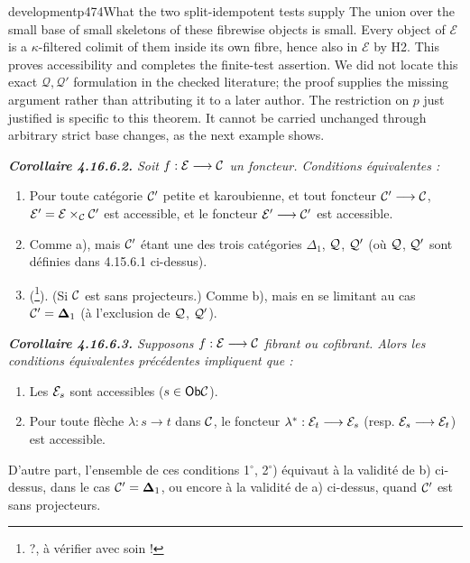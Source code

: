 \begin{dcomment}{development}{p474}{What the two split-idempotent tests supply}
The union over the small base of small skeletons of these fibrewise objects is small. Every object of $\mathcal E$ is a $\kappa$-filtered colimit of them inside its own fibre, hence also in $\mathcal E$ by H2. This proves accessibility and completes the finite-test assertion. We did not locate this exact $\mathcal Q,\mathcal Q'$ formulation in the checked literature; the proof supplies the missing argument rather than attributing it to a later author. The restriction on $p$ just justified is specific to this theorem. It cannot be carried unchanged through arbitrary strict base changes, as the next example shows.
\end{dcomment}


\begingroup\itshape
\noindent\textbf{\upshape Corollaire 4.16.6.2.} Soit $f : \mathcal{E} \longrightarrow \mathcal{C}$ un foncteur. Conditions équivalentes :
\begin{enumerate}[label={}]
\item[a)] Pour toute catégorie $\mathcal{C}'$ \textup{petite} et \textup{karoubienne}, et tout foncteur $\mathcal{C}' \longrightarrow \mathcal{C}$, $\mathcal{E}' = \mathcal{E} \times_{\mathcal{C}} \mathcal{C}'$ est accessible, et le foncteur $\mathcal{E}' \longrightarrow \mathcal{C}'$ est accessible.
\item[b)] Comme a), mais $\mathcal{C}'$ étant une des trois catégories $\Delta_1$, $\mathcal{Q}$, $\mathcal{Q}'$ (où $\mathcal{Q}$, $\mathcal{Q}'$ sont définies dans 4.15.6.1 ci-dessus).
\item[b$'$)] \textup{(}\footnote{?, à vérifier avec soin !}\textup{)}. (Si $\mathcal{C}$ est sans projecteurs.) Comme b), mais en se limitant au cas $\mathcal{C}' = \boldsymbol{\Delta}_1$ (à l'exclusion de $\mathcal{Q}$, $\mathcal{Q}'$).
\end{enumerate}
\endgroup

\begingroup\itshape
\noindent\textbf{\upshape Corollaire 4.16.6.3.} Supposons $f : \mathcal{E} \longrightarrow \mathcal{C}$ fibrant ou cofibrant. Alors les conditions équivalentes précédentes impliquent que :
\begin{enumerate}[label={}]
\item[1$^\circ$)] Les $\mathcal{E}_s$ sont accessibles ($s \in \mathsf{Ob} \mathcal{C}$).
\item[2$^\circ$)] Pour toute flèche $\lambda : s \longrightarrow t$ dans $\mathcal{C}$, le foncteur $\lambda^* : \mathcal{E}_t \longrightarrow \mathcal{E}_s$ (resp. $\mathcal{E}_s \longrightarrow \mathcal{E}_t$) est accessible.
\end{enumerate}
\noindent D'autre part, l'ensemble de ces conditions 1$^\circ$, 2$^\circ$) équivaut à la validité de b) ci-dessus, dans le cas $\mathcal{C}' = \boldsymbol{\Delta}_1$, ou encore à la validité
de a) ci-dessus, quand $\mathcal{C}'$ est \textup{sans projecteurs}.
\endgroup

